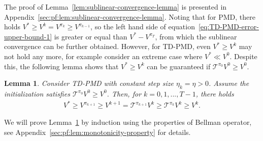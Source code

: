 \documentclass[10pt]{article}
\newcommand{\calT}{\mathcal{T}}
\theoremstyle{plain}
\newtheorem{lemma}[theorem]{Lemma}
\theoremstyle{definition}
\begin{document}
The proof of Lemma~\ref{lem:sublinear-convergence-lemma} is presented in Appendix~\ref{sec:pf:lem:sublinear-convergence-lemma}. Noting that for PMD, there holds $V^* \geq V^k = V^{\pi_k}\geq V^{\pi_{k-1}}$, so the left hand side of equation~\eqref{eq:TD-PMD-error-upper-bound-1} is greater or equal than $V^*-V^{\pi_T}$, from which the sublinear convergence can be further obtained. However, for TD-PMD, even $V^* \geq V^k$ may not hold any more, for example consider an extreme case where $V^*\ll V^0$. %
Despite this, the following lemma shows that $V^*\geq V^k$ can be guaranteed if $\calT^{\pi_0} V^0 \geq V^0$.
\begin{lemma}
Consider TD-PMD with constant step size $\eta_k=\eta>0$. Assume the initialization satisfies $\calT^{\pi_0} V^0 \geq V^0$.    Then, for $k=0,1,...,T-1$, there holds    
    \begin{align}
        V^* \geq V^{\pi_{k+1}} \geq V^{k+1} = \calT^{\pi_{k+1}}V^k \geq \calT^{\pi_k} V^k \geq V^k.
        \label{eq:monotonicity-property}
    \end{align}
    \label{lem:monotonicity-property}
\end{lemma} 
We will prove Lemma~\ref{lem:monotonicity-property} by induction using the properties of Bellman operator, see Appendix~\ref{sec:pf:lem:monotonicity-property} for details.
\end{document}
